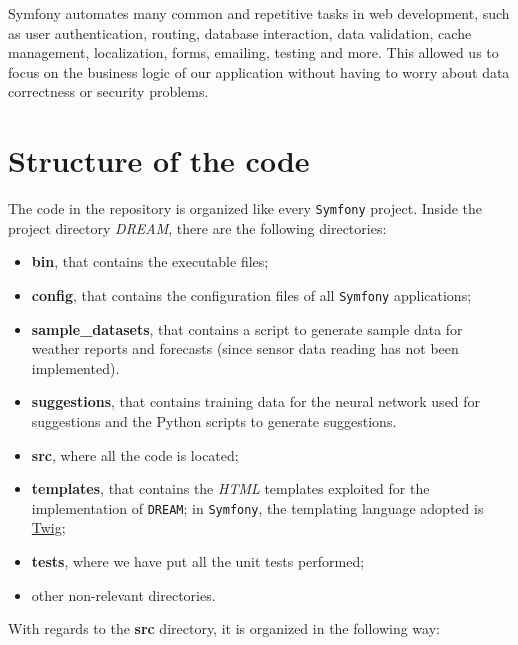 \documentclass{article}
\begin{document}
Symfony automates many common and repetitive tasks in web development, such as user authentication, routing, database interaction, data validation, cache management, localization, forms, emailing, testing and more. This allowed us to focus on the business logic of our application without having to worry about data correctness or security problems.

\newpage
\section{Structure of the code}
The code in the repository is organized like every \verb|Symfony| project. Inside the project directory \textit{DREAM}, there are the following directories:
\begin{itemize}
    \item \textbf{bin}, that contains the executable files;
    \item \textbf{config}, that contains the configuration files of all \verb|Symfony| applications;
    \item \textbf{sample\_datasets}, that contains a script to generate sample data for weather reports and forecasts (since sensor data reading has not been implemented).
    \item \textbf{suggestions}, that contains training data for the neural network used for suggestions and the Python scripts to generate suggestions.
    \item \textbf{src}, where all the code is located;
    \item \textbf{templates}, that contains the \textit{HTML} templates exploited for the implementation of \verb|DREAM|; in \verb|Symfony|, the templating language adopted is \href{https://twig.symfony.com/}{Twig};
    \item \textbf{tests}, where we have put all the unit tests performed;
    \item other non-relevant directories.
\end{itemize}
With regards to the \textbf{src} directory, it is organized in the following way:
\end{document}
